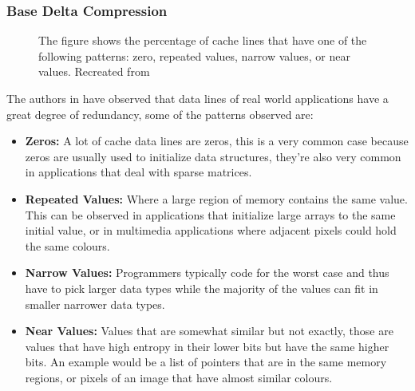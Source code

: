 \subsubsection{Base Delta Compression}
\begin{figure}
    \caption[BDI Patterns]{The figure shows the percentage of cache lines that have one of the following patterns: zero, repeated values, narrow values, or near values. Recreated from \protect\cite{bdi}}
    \label{fig:BDIPotential}
\end{figure}
The authors in \cite{bdi} have observed that data lines of real world applications have a great degree of redundancy, some of the patterns observed are:
\begin{itemize}
    \item \textbf{Zeros:} A lot of cache data lines are zeros\cite{balakrishnan2003exploiting, ekman2005robust, yang2000frequent}, this is a very common case because zeros are usually used to initialize data structures, they're also very common in applications that deal with sparse matrices.
    \item \textbf{Repeated Values:} Where a large region of memory contains the same value\cite{sazeides1997predictability, alameldeen2004adaptive}. This can be observed in applications that initialize large arrays to the same initial value, or in multimedia applications where adjacent pixels could hold the same colours.
    \item \textbf{Narrow Values:} Programmers typically code for the worst case and thus have to pick larger data types while the majority of the values can fit in smaller narrower data types.\cite{alameldeen2004adaptive, islam2010characterization, wilson1999case}
    \item \textbf{Near Values:} Values that are somewhat similar but not exactly, those are values that have high entropy in their lower bits but have the same higher bits. An example would be a list of pointers that are in the same memory regions, or pixels of an image that have almost similar colours.\cite{wilson1999case, sun2008dhtc}
\end{itemize}
